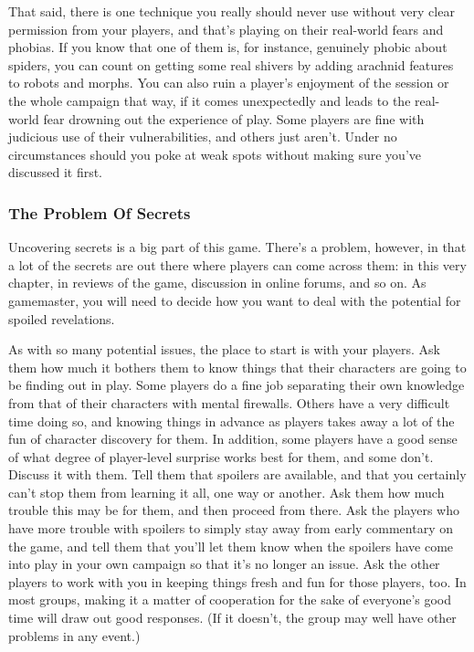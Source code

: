 That said, there is one technique you really should 
never use without very clear permission from your 
players, and that's playing on their real-world fears 
and phobias. If you know that one of them is, for 
instance, genuinely phobic about spiders, you can 
count on getting some real shivers by adding arachnid 
features to robots and morphs. You can also ruin a 
player's enjoyment of the session or the whole campaign
that way, if it comes unexpectedly and leads
to the real-world fear drowning out the experience 
of play. Some players are fine with judicious use of 
their vulnerabilities, and others just aren't. Under no 
circumstances should you poke at weak spots without 
making sure you've discussed it first. 

\subsubsection{The Problem Of Secrets }

Uncovering secrets is a big part of this game. There's 
a problem, however, in that a lot of the secrets are out 
there where players can come across them: in this very 
chapter, in reviews of the game, discussion in online 
forums, and so on. As gamemaster, you will need to 
decide how you want to deal with the potential for 
spoiled revelations. 

As with so many potential issues, the place to start 
is with your players. Ask them how much it bothers 
them to know things that their characters are going 
to be finding out in play. Some players do a fine job 
separating their own knowledge from that of their 
characters with mental firewalls. Others have a very 
difficult time doing so, and knowing things in advance 
as players takes away a lot of the fun of character 
discovery for them. In addition, some players have 
a good sense of what degree of player-level surprise 
works best for them, and some don't. Discuss it with 
them. Tell them that spoilers are available, and that 
you certainly can't stop them from learning it all, one 
way or another. Ask them how much trouble this may 
be for them, and then proceed from there. Ask the 
players who have more trouble with spoilers to simply 
stay away from early commentary on the game, and 
tell them that you'll let them know when the spoilers 
have come into play in your own campaign so that 
it's no longer an issue. Ask the other players to work 
with you in keeping things fresh and fun for those 
players, too. In most groups, making it a matter of 
cooperation for the sake of everyone's good time will 
draw out good responses. (If it doesn't, the group may 
well have other problems in any event.) 

